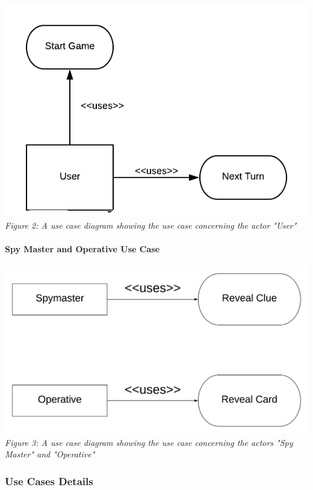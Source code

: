 \documentclass[10pt, a4paper]{article}
\begin{document}
			\begin{center}	
				\includegraphics[scale=2.0]{Images/02_uc_user.png}
				\textit{\\Figure 2: A use case diagram showing the use case concerning the actor "User"}
			\end{center} 
			
			\paragraph{Spy Master and Operative Use Case}
			
			\begin{center}
				\includegraphics[scale=0.4]{Images/03_uc_spymaster_and_operative.png}
				\textit{\\Figure 3: A use case diagram showing the use case concerning the actors "Spy Master" and "Operative"}
			\end{center}
		\pagebreak
		\subsubsection{Use Cases Details}
		
\end{document}
